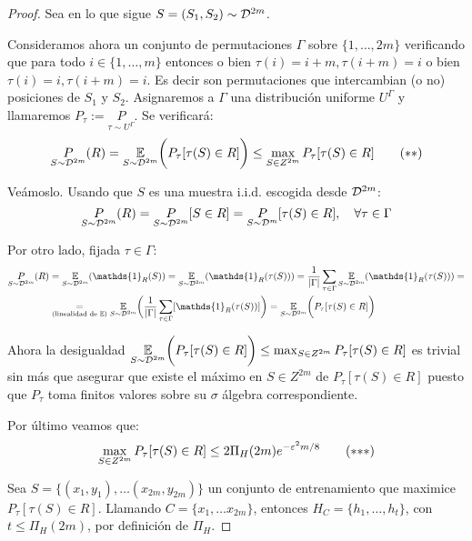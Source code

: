 \begin{proof}
 Sea en lo que sigue $S = (S_1, S_2) \sim \mathcal{D}^{2m}$.
 
 Consideramos ahora un conjunto de permutaciones $\Gamma$ sobre $\{1, \ldots, 2m\}$ verificando que para todo $i\in \{1,\ldots, m\}$
 entonces o bien $\tau(i) = i+m, \tau(i+m) = i$ o bien $\tau(i) = i, \tau(i+m) = i$. Es decir son permutaciones que intercambian
 (o no) posiciones de $S_1$ y $S_2$. Asignaremos a $\Gamma$ una distribución uniforme $U^{\Gamma}$ y llamaremos 
 $P_{\tau} := \underset{\tau \sim U^{\Gamma}}{P}$. Se verificará: 
 \begin{equation}
  \dosmprob(R) = \dosmexpect \bigg(P_{\tau} [\tau(S) \in R] \bigg) \le \max_{S\in Z^{2m}} P_{\tau}[\tau(S) \in R]  
  \label{eqn:Rbound}\tag{\textrm{$\ast$$\ast$}}
 \end{equation}

  Veámoslo. Usando que $S$ es una muestra i.i.d. escogida desde $\mathcal{D}^{2m}$:
  \[
    \underset{S\sim \mathcal{D}^{2m}}{P}(R) = \underset{S\sim \mathcal{D}^{2m}}{P}[S \in R] = \underset{S\sim \mathcal{D}^m}{P}[\tau(S) \in R], \quad \forall \tau \in \Gamma
  \]
  
  Por otro lado, fijada $\tau \in \Gamma$:
  \begin{align*}
  \dosmprob(R) &= \dosmexpect (\mathds{1}_R(S)) = \dosmexpect (\mathds{1}_R(\tau(S)))
    = \frac{1}{|\Gamma|} \sum_{\tau \in \Gamma} \dosmexpect (\mathds{1}_R(\tau(S))) = \\
    &\underset{\textrm{(linealidad de $\expect$)}}{=} \dosmexpect \bigg( \frac{1}{|\Gamma|} 
    \sum_{\tau \in \Gamma} [\mathds{1}_R(\tau(S))]\bigg) = \dosmexpect \bigg(P_{\tau} [\tau(S) \in R] \bigg)
  \end{align*}

  Ahora la desigualdad $\underset{S\sim \mathcal{D}^{2m}}{\mathbb{E}} \bigg(P_{\tau} [\tau(S) \in R] \bigg) \le \max_{S\in Z^{2m}} P_{\tau}[\tau(S) \in R]$
  es trivial sin más que asegurar que existe el máximo en $S\in Z^{2m}$ de $P_{\tau}[\tau(S) \in R]$ puesto que $P_{\tau}$
  toma finitos valores sobre su $\sigma$ álgebra correspondiente.
 
 Por último veamos que:
 \begin{equation}
  \max_{S\in Z^{2m}} P_{\tau}[\tau(S) \in R] \le 2\Pi_H(2m) e^{-\varepsilon^2 m/8}
  \label{eqn:permbound}\tag{\textrm{$\ast$$\ast$$\ast$}}
 \end{equation}

  Sea $S = \{(x_1, y_1), \ldots (x_{2m}, y_{2m})\}$ un conjunto de entrenamiento que maximice $P_{\tau}[\tau(S) \in R]$. 
  Llamando $C=\{x_1, \ldots x_{2m}\}$, entonces $H_C = \{h_1, \ldots, h_t\}$, con $t\le \Pi_H(2m)$, por definición de $\Pi_H$.


\end{proof}
